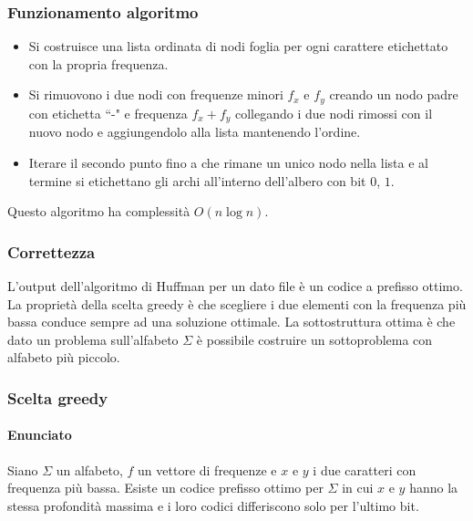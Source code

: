 \subsubsection{Funzionamento algoritmo}
\begin{itemize}
	\item Si costruisce una lista ordinata di nodi foglia per ogni carattere etichettato con la propria frequenza.
	\item Si rimuovono i due nodi con frequenze minori $f_x$ e $f_y$ creando un nodo padre con etichetta ``-" e frequenza $f_x+f_y$ collegando i due nodi rimossi con il nuovo nodo e
		aggiungendolo alla lista mantenendo l'ordine.
	\item Iterare il secondo punto fino a che rimane un unico nodo nella lista e al termine si etichettano gli archi all'interno dell'albero con bit $0$, $1$.
\end{itemize}

Questo algoritmo ha complessit\`a $O(n\log n)$. 
\subsubsection{Correttezza}
L'output dell'algoritmo di Huffman per un dato file \`e un codice a prefisso ottimo. La propriet\`a della scelta greedy \`e che scegliere i due elementi con la frequenza pi\`u bassa 
conduce sempre ad una soluzione ottimale. La sottostruttura ottima \`e che dato un problema sull'alfabeto $\Sigma$ \`e possibile costruire un sottoproblema con alfabeto pi\`u piccolo. 
\subsubsection{Scelta greedy}
\paragraph{Enunciato} 
Siano $\Sigma$ un alfabeto, $f$ un vettore di frequenze e $x$ e $y$ i due caratteri con frequenza pi\`u bassa. Esiste un codice prefisso ottimo per $\Sigma$ in cui $x$ e $y$ hanno la
stessa profondit\`a massima e i loro codici differiscono solo per l'ultimo bit. 
